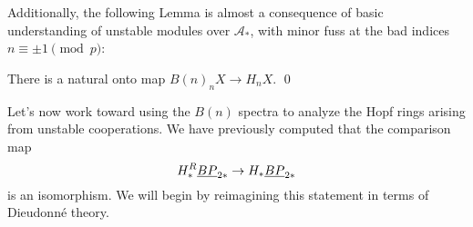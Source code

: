 Additionally, the following Lemma is almost a consequence of basic understanding of unstable modules over $\mathcal A_*$, with minor fuss at the bad indices $n \equiv \pm 1 \pmod p$:

\begin{lemma}
There is a natural onto map $B(n)_n X \to H_n X$. \qed
\end{lemma}




Let's now work toward using the $B(n)$ spectra to analyze the Hopf rings arising from unstable cooperations.  We have previously computed that the comparison map \[H_*^R \underline{\smash{BP}}_{2*} \to H_* \underline{\smash{BP}}_{2*}\] is an isomorphism.  We will begin by reimagining this statement in terms of Dieudonn\'e theory.

